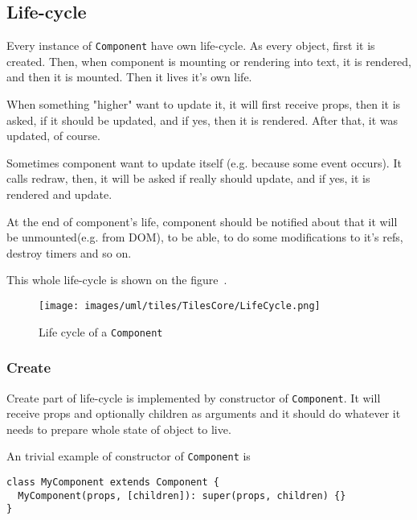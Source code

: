 \documentclass[oneside, 12pt]{book}
\begin{document}
  \subsection{Life-cycle}\label{subsec:our-architecture-lifecycle}

    Every instance of \texttt{Component} have own life-cycle. 
    As every object, first it is created. 
    Then, when component is mounting or rendering into text, it is rendered, and then it is mounted.
    Then it lives it's own life. 

    When something "higher" want to update it, it will first receive props, 
    then it is asked, if it should be updated, and if yes, then it is rendered.
    After that, it was updated, of course.

    Sometimes component want to update itself (e.g. because some event occurs).
    It calls redraw, then, it will be asked if really should update, and if yes, it is rendered and update.

    At the end of component's life, 
    component should be notified about that it will be unmounted(e.g. from DOM), 
    to be able, to do some modifications to it's refs, destroy timers and so on. 

    This whole life-cycle is shown on the figure~.

    \begin{figure}[h]
    \centering  
      \texttt{[image: images/uml/tiles/TilesCore/LifeCycle.png]}
      \caption{Life cycle of a \texttt{Component}}
      \label{img:our-life-cycle}
    \end{figure}

    \subsubsection{Create}\label{subsec:our-architecture-lifecycle-create}

      Create part of life-cycle is implemented by constructor of \texttt{Component}. 
      It will receive props and optionally children as arguments and 
      it should do whatever it needs to prepare whole state of object to live.

      An trivial example of constructor of \texttt{Component} is 
      \begin{verbatim}
class MyComponent extends Component {
  MyComponent(props, [children]): super(props, children) {}
}
      \end{verbatim}
\end{document}
